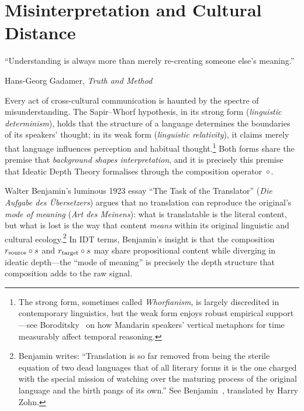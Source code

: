 
\chapter{Misinterpretation and Cultural Distance}
\label{ch:misinterp}

\epigraph{``Understanding is always more than merely re-creating someone
else's meaning.''}{Hans-Georg Gadamer, \textit{Truth and Method}}


Every act of cross-cultural communication is haunted by the spectre of
misunderstanding.  The Sapir--Whorf hypothesis, in its strong form
(\emph{linguistic determinism}), holds that the structure of a language
determines the boundaries of its speakers' thought; in its weak form
(\emph{linguistic relativity}), it claims merely that language influences
perception and habitual thought.\footnote{The strong form, sometimes
called \emph{Whorfianism}, is largely discredited in contemporary
linguistics, but the weak form enjoys robust empirical support---see
Boroditsky~\cite{boroditsky2001} on how Mandarin speakers' vertical
metaphors for time measurably affect temporal reasoning.}  Both forms
share the premise that \emph{background shapes interpretation}, and it is
precisely this premise that Ideatic Depth Theory formalises through the
composition operator~$\circ$.

Walter Benjamin's luminous 1923 essay ``The Task of the Translator''
(\textit{Die Aufgabe des \"Ubersetzers}) argues that no translation can
reproduce the original's \emph{mode of meaning}
(\textit{Art des Meinens}): what is translatable is the literal content,
but what is lost is the way that content \emph{means} within its
original linguistic and cultural ecology.\footnote{Benjamin writes:
``Translation is so far removed from being the sterile equation of two
dead languages that of all literary forms it is the one charged with the
special mission of watching over the maturing process of the original
language and the birth pangs of its own.''  See
Benjamin~\cite{benjamin1923}, translated by Harry Zohn.}  In IDT terms,
Benjamin's insight is that the composition $r_{\mathrm{source}} \circ s$
and $r_{\mathrm{target}} \circ s$ may share propositional content
while diverging in ideatic depth---the ``mode of meaning'' is precisely
the depth structure that composition adds to the raw signal.

